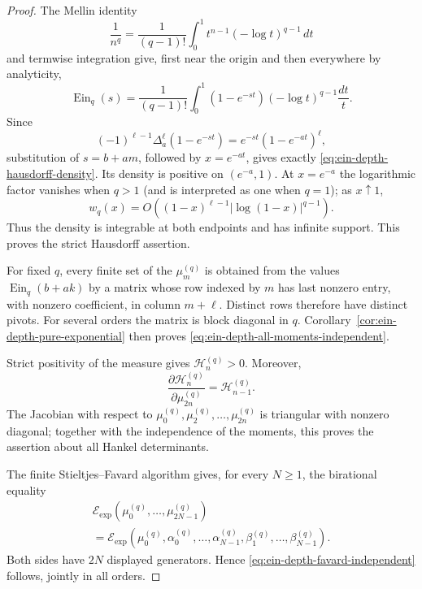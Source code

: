 \documentclass[11pt]{article}
\theoremstyle{definition}
\theoremstyle{remark}
\newcommand{\EinDepth}[1]{\operatorname{Ein}_{#1}}
\newcommand{\Eexp}{\mathcal E_{\mathrm{exp}}}
\begin{document}
\begin{proof}
The Mellin identity
\[
 \frac1{n^q}=\frac1{(q-1)!}
 \int_0^1t^{n-1}(-\log t)^{q-1}\,dt
\]
and termwise integration give, first near the origin and then everywhere
by analyticity,
\begin{equation}\label{eq:ein-depth-mellin-integral}
 \EinDepth{q}(s)=\frac1{(q-1)!}
 \int_0^1(1-e^{-st})(-\log t)^{q-1}\frac{dt}{t}.
\end{equation}
Since
\[
 (-1)^{\ell-1}\Delta_a^\ell(1-e^{-st})
 =e^{-st}(1-e^{-at})^\ell,
\]
substitution of \(s=b+am\), followed by \(x=e^{-at}\), gives exactly
\eqref{eq:ein-depth-hausdorff-density}.  Its density is positive on
\((e^{-a},1)\).  At \(x=e^{-a}\) the logarithmic factor vanishes when
\(q>1\) (and is interpreted as one when \(q=1\)); as \(x\uparrow1\),
\[
 w_q(x)=O\!\left((1-x)^{\ell-1}
             \left|\log(1-x)\right|^{q-1}\right).
\]
Thus the density is integrable at both endpoints and has infinite support.
This proves the strict Hausdorff assertion.

For fixed \(q\), every finite set of the \(\mu_m^{(q)}\) is obtained from
the values
\(\EinDepth{q}(b+ak)\) by a matrix whose row indexed by \(m\) has last
nonzero entry, with nonzero coefficient, in column \(m+\ell\).  Distinct
rows therefore have distinct pivots.  For several orders the matrix is
block diagonal in \(q\).  Corollary~\ref{cor:ein-depth-pure-exponential}
then proves \eqref{eq:ein-depth-all-moments-independent}.

Strict positivity of the measure gives \(\mathcal H_n^{(q)}>0\).  Moreover,
\begin{equation}\label{eq:ein-depth-hankel-triangular-jacobian}
 \frac{\partial\mathcal H_n^{(q)}}
      {\partial\mu_{2n}^{(q)}}=\mathcal H_{n-1}^{(q)}.
\end{equation}
The Jacobian with respect to
\(\mu_0^{(q)},\mu_2^{(q)},\ldots,\mu_{2n}^{(q)}\) is triangular with
nonzero diagonal; together with the independence of the moments, this
proves the assertion about all Hankel determinants.

The finite Stieltjes--Favard algorithm gives, for every \(N\geq1\), the
birational equality
\begin{multline}\label{eq:ein-depth-moment-favard-fields}
 \Eexp(\mu_0^{(q)},\ldots,\mu_{2N-1}^{(q)})\\
 =\Eexp(\mu_0^{(q)},
   \alpha_0^{(q)},\ldots,\alpha_{N-1}^{(q)},
   \beta_1^{(q)},\ldots,\beta_{N-1}^{(q)}).
\end{multline}
Both sides have \(2N\) displayed generators.  Hence
\eqref{eq:ein-depth-favard-independent} follows, jointly in all orders.


\end{proof}
\end{document}

